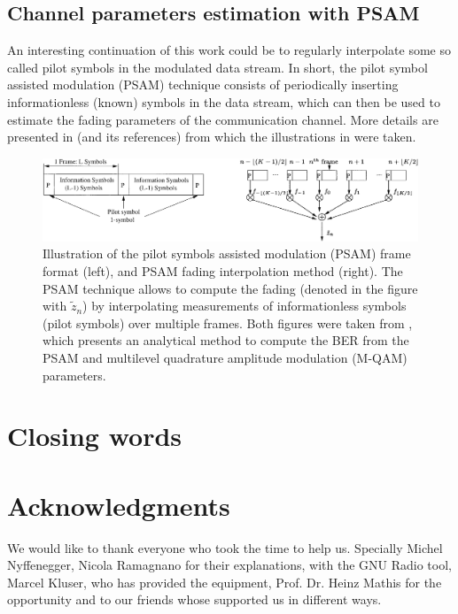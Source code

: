 \subsection{Channel parameters estimation with PSAM}

An interesting continuation of this work could be to regularly interpolate some so called pilot symbols in the modulated data stream. In short, the pilot symbol assisted modulation (PSAM) technique consists of periodically inserting informationless (known) symbols in the data stream, which can then be used to estimate the fading parameters of the communication channel. More details are presented in \cite{Xiaoyi1999} (and its references) from which the illustrations in  were taken.

\begin{figure}
	\centering
	\includegraphics[width = \linewidth]{figures/xiaoyi-psam-figures}
	\caption{
		Illustration of the pilot symbols assisted modulation (PSAM) frame format (left), and PSAM fading interpolation method (right). The PSAM technique allows to compute the fading (denoted in the figure with \(\tilde{z}_n\)) by interpolating measurements of informationless symbols (pilot symbols) over multiple frames. Both figures were taken from \cite{Xiaoyi1999}, which presents an analytical method to compute the BER from the PSAM and multilevel quadrature amplitude modulation (M-QAM) parameters.
		\label{fig:psam}
	}
\end{figure}

\section{Closing words}

\section{Acknowledgments}


We would like to thank everyone who took the time to help us. Specially Michel Nyffenegger, Nicola Ramagnano for their explanations, with the GNU Radio tool,
Marcel Kluser, who has provided the equipment, Prof. Dr. Heinz Mathis for the opportunity and to our friends whose supported us in different ways.



